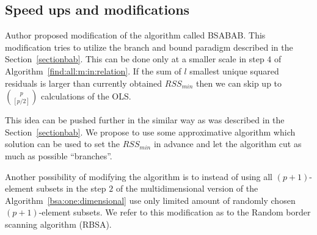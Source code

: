 \subsection{Speed ups and modifications}
Author proposed modification of the algorithm called BSABAB. This modification tries to utilize the branch and bound paradigm described in the Section~\ref{sectionbab}. This can be done only at a smaller scale in step $4$ of Algorithm~\ref{find:all:m:in:relation}. If the sum of $l$ smallest unique squared residuals is larger than currently obtained $RSS_{min}$ then we can skip up to  $\binom{p}{[p/2]}$ calculations of the OLS.

This idea can be pushed further in the similar way as was described in the Section~\ref{sectionbab}. We propose to use some approximative algorithm which solution can be used to set the $RSS_{min}$ in advance and let the algorithm cut as much as possible ``branches''.

Another possibility  of modifying the algorithm is to instead of using all $(p+1)$-element subsets in the step $2$ of the multidimensional version of the Algorithm~\ref{bsa:one:dimensional} use only limited amount of randomly chosen $(p+1)$-element subsets. We refer to this modification as to the Random border scanning algorithm (RBSA).